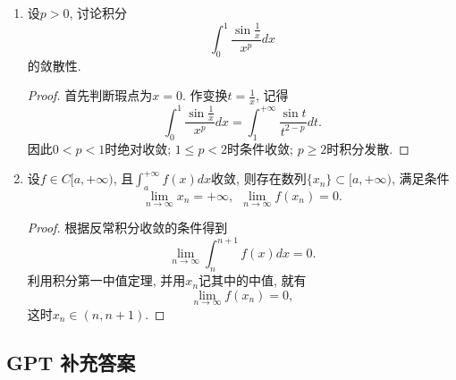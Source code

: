 \documentclass[UTF8,11pt, a4paper, oneside, fontset=none]{ctexbook}
\begin{document}
\begin{enumerate}
\begin{proof}

当$ p < 1$时, $x=0$为瑕点; 当$q < 1$时, $x = 1$是瑕点. 当$p, q \geq 1$时为定积分, 无需考虑.


分解积分为
\[
\int_0^1 x^{p-1} (1-x)^{q-1} dx = \int_0^a x^{p-1} (1-x)^{q-1} dx + \int_a^1 x^{p-1} (1-x)^{q-1} dx = I_1 + I_2,
\]
其中$a \in (0, 1)$.

对$I_1$, 当$x \to 0$时,
\[
x^{p-1} (1-x)^{q-1} \sim x^{p-1},
\]
因此$p > 0$时积分收敛.

对$I_2$, 当$x \to 1$时,
\[
x^{p-1} (1-x)^{q-1} \sim (1-x)^{q-1},
\]
因此当$q >0$时收敛.


综上, 原积分在$p>0, q>0$时收敛.


\end{proof}


\item 设$p>0$, 讨论积分
\[
\int_0^1 \frac{\sin \frac{1}{x}}{x^p} dx
\]
的敛散性.


\begin{proof}

首先判断瑕点为$x = 0$. 作变换$t = \frac{1}{x}$, 记得
\[
\int_0^1 \frac{\sin \frac{1}{x}}{x^p} dx = \int_1^{+\infty} \frac{\sin t}{t^{2-p}} dt.
\]
因此$0 < p < 1$时绝对收敛; $1 \leq p < 2$时条件收敛; $p \geq 2$时积分发散.

\end{proof}


\item 设$f \in C[a, +\infty)$, 且$\int_a^{+\infty} f(x) dx$收敛, 则存在数列$\{ x_n \} \subset [a, +\infty)$, 满足条件
\[
\lim_{n \to \infty} x_n = +\infty, \ \ \lim_{n \to \infty} f(x_n) = 0.
\]


\begin{proof}


根据反常积分收敛的条件得到
\[
\lim_{n \to \infty} \int_n^{n+1} f(x) dx =0.
\]
利用积分第一中值定理, 并用$x_n$记其中的中值, 就有
\[
\lim_{n \to \infty} f(x_n) = 0,
\]
这时$x_n \in (n, n+1)$.
\end{proof}



\end{enumerate}

\clearpage

\subsection*{GPT 补充答案}
\end{document}
